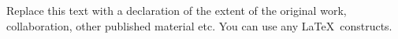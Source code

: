 \documentclass[11pt,a4paper]{report}      %
\begin{document}
\thesiscopyrightpage                 %

 \thesistitlepage                     %


\tableofcontents                     %

\begin{thesisacknowledgments}        %


\end{thesisacknowledgments}

\begin{thesisdeclaration}        %
Replace this text with a declaration of the extent of the original work,
collaboration, other published material etc. You can use any \LaTeX\
constructs.

\end{thesisdeclaration}


\begin{thesisabstract}               %
\end{thesisabstract}
\end{document}
